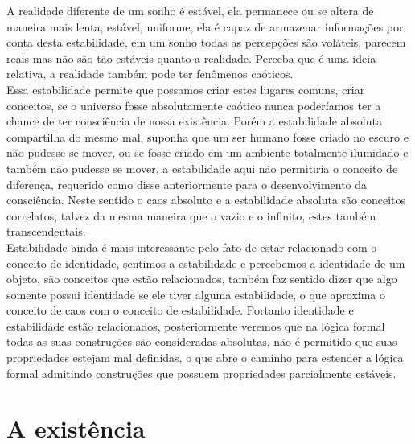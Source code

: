 \documentclass[10pt,a4paper]{report}
\begin{document}
A realidade diferente de um sonho é estável, ela permanece ou se altera de maneira mais lenta, estável, uniforme, ela é capaz de armazenar informações por conta desta estabilidade, em um sonho todas as percepções são voláteis, parecem reais mas não são tão estáveis quanto a realidade. Perceba que é uma ideia relativa, a realidade também pode ter fenômenos caóticos. \\

Essa estabilidade permite que possamos criar estes lugares comuns, criar conceitos, se o universo fosse absolutamente caótico nunca poderíamos ter a chance de ter consciência de nossa existência. Porém a estabilidade absoluta compartilha do mesmo mal, suponha que um ser humano fosse criado no escuro e não pudesse se mover, ou se fosse criado em um ambiente totalmente ilumidado e também não pudesse se mover, a estabilidade aqui não permitiria o conceito de diferença, requerido como disse anteriormente para o desenvolvimento da consciência. Neste sentido o caos absoluto e a estabilidade absoluta são conceitos correlatos, talvez da mesma maneira que o vazio e o infinito, estes também transcendentais.\\

Estabilidade ainda é mais interessante pelo fato de estar relacionado com o conceito de identidade, sentimos a estabilidade e percebemos a identidade de um objeto, são conceitos que estão relacionados, também faz sentido dizer que algo somente possui identidade se ele tiver alguma estabilidade, o que aproxima o conceito de caos com o conceito de estabilidade. Portanto identidade e estabilidade estão relacionados, posteriormente veremos que na lógica formal todas as suas construções são consideradas absolutas, não é permitido que suas propriedades estejam mal definidas, o que abre o caminho para estender a lógica formal admitindo construções que possuem propriedades parcialmente estáveis.





\section{A existência}
\end{document}
